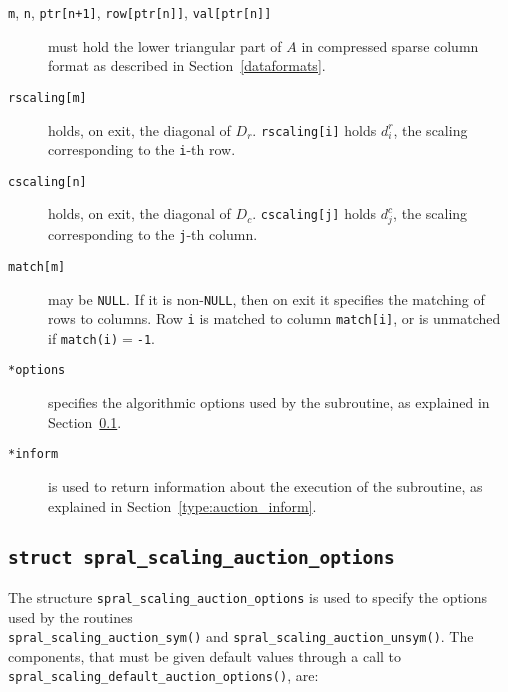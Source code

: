 \begin{description}

\item[\texttt{m}, \texttt{n}, \texttt{ptr[n+1]}, \texttt{row[ptr[n]]}, \texttt{val[ptr[n]]}] must hold the lower triangular part of $A$ in compressed sparse column format as described in Section~\ref{dataformats}.

\item[\texttt{rscaling[m]}] holds, on exit, the diagonal of $D_r$.
\texttt{rscaling[i]} holds $d^r_i$, the scaling corresponding to
the \texttt{i}-th row.

\item[\texttt{cscaling[n]}] holds, on exit, the diagonal of $D_c$.
\texttt{cscaling[j]} holds $d^c_j$, the scaling corresponding to
the \texttt{j}-th column.

\item[\texttt{match[m]}] may be \texttt{NULL}. If it is non-\texttt{NULL},
then on exit it specifies the matching of rows to columns.
Row \texttt{i} is matched to column \texttt{match[i]}, or is unmatched
if \texttt{match(i)}$=$\texttt{-1}.

\item[\texttt{*options}] specifies the algorithmic options used by the subroutine, as explained in Section~\ref{type:auction_options}.

\item[\texttt{*inform}] is used to return information about the execution of the subroutine, as explained in Section~\ref{type:auction_inform}.


\end{description}

\subsection{\texttt{struct spral\_scaling\_auction\_options}} \label{type:auction_options}

The structure \texttt{spral\_scaling\_auction\_options} is used to specify the options
used by the routines \\\texttt{spral\_scaling\_auction\_sym()} and \texttt{spral\_scaling\_auction\_unsym()}. The components, that
must be given default values through a call to \texttt{spral\_scaling\_default\_auction\_options()}, are:

